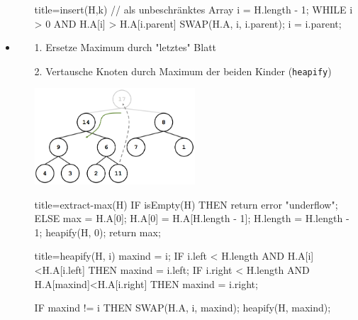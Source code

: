 \documentclass[
    12pt,
    a4paper,
    ngerman,
    color=3b,%
    marginpar=false,
    colorback=false,
    leqno,
]{tudaexercise}
\begin{document}
\begin{itemize}
\begin{itemize}
\begin{ccode}[autogobble]{title={insert(H,k) // als unbeschränktes Array}}
                    i = H.length - 1;
                    WHILE i > 0 AND H.A[i] > H.A[i.parent]
                        SWAP(H.A, i, i.parent);
                        i = i.parent;
                    \end{ccode}
            \end{itemize}
\clearpage
        \item {}
            \begin{itemize}
                \item[1.] Ersetze Maximum durch "letztes" Blatt
                \item[2.] Vertausche Knoten durch Maximum der beiden Kinder (\texttt{heapify})
                \item[]
                    \begin{minipage}{0.33\textwidth}
                        \includegraphics[width=6cm]{pictures/heapDelete.PNG}
                    \end{minipage} 
                    \begin{minipage}{0.57\textwidth}
                        \begin{ccode}[autogobble]{title={extract-max(H)}}
                        IF isEmpty(H) THEN return error "underflow";
                        ELSE
                            max = H.A[0];
                            H.A[0] = H.A[H.length - 1];
                            H.length = H.length - 1;
                            heapify(H, 0);
                            return max;
                        \end{ccode}
                    \end{minipage}
                \item[]
                    \begin{ccode}[autogobble]{title={heapify(H, i)}}
                    maxind = i;
                    IF i.left < H.length AND H.A[i]<H.A[i.left] THEN
                        maxind = i.left;
                    IF i.right < H.length AND H.A[maxind]<H.A[i.right] THEN
                        maxind = i.right;

                    IF maxind != i THEN
                        SWAP(H.A, i, maxind);
                        heapify(H, maxind);
                    \end{ccode}
            \end{itemize}


\end{itemize}
\end{document}
